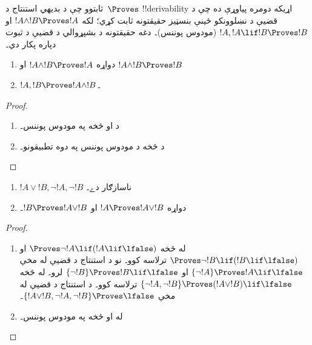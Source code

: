 \documentclass[../../../include/open-logic-section]{subfiles}
\begin{document}
      {}
      {}


\begin{explain}
  ثابتوو چې د بديهي استنتاج د~$\Proves$ !!{derivability} اړيکه
  دومره پياوړې ده چې د قضيې د نښلوونکو ځينې بنسټيز حقيقتونه ثابت
  کړي؛ لکه $!A \land !B \Proves !A$ او
  $!A, !A \lif !B \Proves !B$ (مودوس پوننس)۔ دغه حقيقتونه د
  بشپړوالي د قضیې د ثبوت دپاره پکار دي۔
\end{explain}

\begin{prop}
  \begin{enumerate}
  \item {} دواړه
    $!A \land !B \Proves !A$ او $!A \land !B \Proves !B$
  \item {}
    $!A, !B \Proves !A \land !B$۔
  \end{enumerate}
\end{prop}

\begin{proof}
  \begin{enumerate}
    \item د  او  څخه په
      مودوس پوننس۔
  \item د  څخه د مودوس پوننس په دوه تطبيقونو۔
  \end{enumerate}
\end{proof}


\begin{prop}
  \begin{enumerate}
  \item $!A \lor !B, \lnot !A, \lnot !B$ ناسازګار دے۔
  \item دواړه $!A \Proves !A \lor !B$ او
    $!B \Proves !A \lor !B$۔
  \end{enumerate}
\end{prop}

\begin{proof}
  \begin{enumerate}
  \item له  څخه
    $\Proves \lnot !A \lif (!A \lif \lfalse)$ او
    $\Proves \lnot !B \lif (!B \lif \lfalse)$ ترلاسه کوو۔ نو د
    استنتاج د قضیې له مخې $\{\lnot !A\} \Proves !A \lif \lfalse$
    او $\{\lnot !B\} \Proves !B \lif \lfalse$ لرو۔ له
     څخه
    $\{\lnot !A, \lnot !B\} \Proves (!A \lor !B) \lif \lfalse$
    ترلاسه کوو۔ د استنتاج د قضیې له مخې
    $\{!A \lor !B, \lnot !A, \lnot !B\} \Proves \lfalse$۔
  \item له  او  څخه په
    مودوس پوننس۔
  \end{enumerate}
\end{proof}
\end{document}
